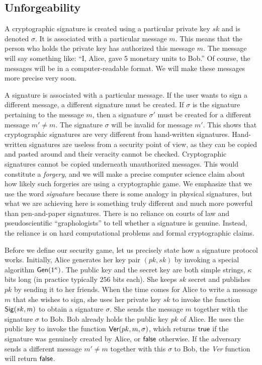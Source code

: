 \subsection*{Unforgeability}

A cryptographic signature is created using a particular private key $sk$ and is
denoted
$\sigma$.
It is associated with a particular message $m$. This means that
the person who holds the private key has authorized this message $m$. The message
will say something like: ``I, Alice, gave 5 monetary units to Bob.'' Of course, the
messages will be in a computer-readable format. We will make these messages more
precise very soon.

A signature is associated with a particular message. If the user wants to sign a
different message, a different signature must be created. If $\sigma$ is the signature
pertaining to the message $m$, then a signature $\sigma'$ must be created for a
different message $m' \neq m$. The signature $\sigma$ will be invalid for message $m'$.
This shows that cryptographic signatures are very different from hand-written signatures.
Hand-written signatures are useless from a security point of view, as they can be
copied and pasted around and their veracity cannot be checked. Cryptographic
signatures cannot be copied underneath unauthorized messages. This would constitute
a \emph{forgery}, and we will make a precise computer science claim about how
likely such forgeries are using a cryptographic game. We emphasize that we use the
word \emph{signature} because there is some analogy in physical signatures, but
what we are achieving here is something truly different and much more powerful
than pen-and-paper signatures. There is no reliance on courts of law and pseudoscientific
``graphologists'' to tell whether a signature is genuine. Instead, the reliance is
on hard computational problems and formal cryptographic claims.

Before we define our security game, let us precisely state how a signature protocol
works. Initially, Alice generates her key pair $(pk, sk)$ by invoking a special algorithm
$\mathsf{Gen}(1^\kappa)$. The public key and the secret key are both simple strings, $\kappa$
bits long (in practice typically $256$ bits each).
She keeps $sk$ secret and publishes $pk$ by
sending it to her friends. When the time comes for Alice to write a message $m$
that she wishes to sign, she uses her private key $sk$ to invoke the function
$\mathsf{Sig}(sk, m)$
to obtain a signature $\sigma$. She sends the message $m$ together
with the signature $\sigma$ to Bob. Bob already holds the public key $pk$ of Alice.
He uses the public key to invoke the function
$\mathsf{Ver}(pk, m, \sigma)$,
which returns
$\textsf{true}$ if the signature was genuinely created by Alice, or $\textsf{false}$ otherwise.
If the adversary sends a different message $m' \neq m$ together with this $\sigma$
to Bob, the \emph{Ver} function will return $\textsf{false}$.


